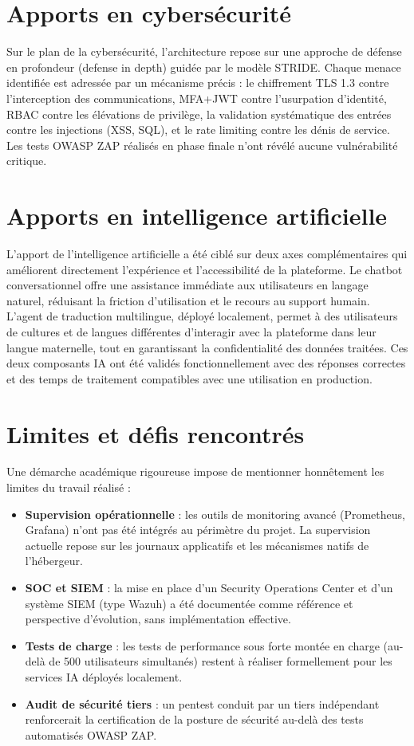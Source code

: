 \section*{Apports en cybersécurité}
Sur le plan de la cybersécurité, l'architecture repose sur une approche de défense en profondeur (defense in depth) guidée par le modèle STRIDE. Chaque menace identifiée est adressée par un mécanisme précis : le chiffrement TLS 1.3 contre l'interception des communications, MFA+JWT contre l'usurpation d'identité, RBAC contre les élévations de privilège, la validation systématique des entrées contre les injections (XSS, SQL), et le rate limiting contre les dénis de service. Les tests OWASP ZAP réalisés en phase finale n'ont révélé aucune vulnérabilité critique.

\section*{Apports en intelligence artificielle}
L'apport de l'intelligence artificielle a été ciblé sur deux axes complémentaires qui améliorent directement l'expérience et l'accessibilité de la plateforme. Le chatbot conversationnel offre une assistance immédiate aux utilisateurs en langage naturel, réduisant la friction d'utilisation et le recours au support humain. L'agent de traduction multilingue, déployé localement, permet à des utilisateurs de cultures et de langues différentes d'interagir avec la plateforme dans leur langue maternelle, tout en garantissant la confidentialité des données traitées. Ces deux composants IA ont été validés fonctionnellement avec des réponses correctes et des temps de traitement compatibles avec une utilisation en production.

\section*{Limites et défis rencontrés}
Une démarche académique rigoureuse impose de mentionner honnêtement les limites du travail réalisé :
\begin{itemize}
    \item \textbf{Supervision opérationnelle} : les outils de monitoring avancé (Prometheus, Grafana) n'ont pas été intégrés au périmètre du projet. La supervision actuelle repose sur les journaux applicatifs et les mécanismes natifs de l'hébergeur.
    \item \textbf{SOC et SIEM} : la mise en place d'un Security Operations Center et d'un système SIEM (type Wazuh) a été documentée comme référence et perspective d'évolution, sans implémentation effective.
    \item \textbf{Tests de charge} : les tests de performance sous forte montée en charge (au-delà de 500 utilisateurs simultanés) restent à réaliser formellement pour les services IA déployés localement.
    \item \textbf{Audit de sécurité tiers} : un pentest conduit par un tiers indépendant renforcerait la certification de la posture de sécurité au-delà des tests automatisés OWASP ZAP.
\end{itemize}

